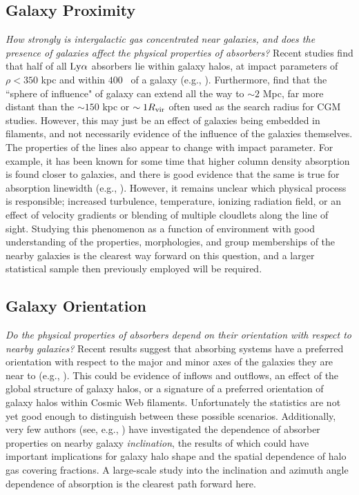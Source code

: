 \subsection{Galaxy Proximity}
\emph{How strongly is intergalactic gas concentrated near galaxies, and does the presence of galaxies affect the physical properties of absorbers?} Recent studies find that half of all $\rm Ly\alpha$ absorbers lie within galaxy halos, at impact parameters of $\rho <350$ kpc and within $400$ \kms~of a galaxy (e.g., \citealt{cote2005, prochaska2006, wakker2009}). Furthermore, \cite{sorini2018} find that the ``sphere of influence" of galaxy can extend all the way to $\sim 2$ Mpc, far more distant than the $\sim150$ kpc or $\sim 1 R_{\rm vir}$ often used as the search radius for CGM studies. However, this may just be an effect of galaxies being embedded in filaments, and not necessarily evidence of the influence of the galaxies themselves. The properties of the lines also appear to change with impact parameter. For example, it has been known for some time that higher column density absorption is found closer to galaxies, and there is good evidence that the same is true for absorption linewidth (e.g., \citealt{wakker2009, prochaska2011}). However, it remains unclear which physical process is responsible; increased turbulence, temperature, ionizing radiation field, or an effect of velocity gradients or blending of multiple cloudlets along the line of sight. Studying this phenomenon as a function of environment with good understanding of the properties, morphologies, and group memberships of the nearby galaxies is the clearest way forward on this question, and a larger statistical sample then previously employed will be required.


\subsection{Galaxy Orientation}
\emph{Do the physical properties of absorbers depend on their orientation with respect to nearby galaxies?} Recent results suggest that absorbing systems have a preferred orientation with respect to the major and minor axes of the galaxies they are near to (e.g., \citealt{kacprzak2011_inclination, kacprzak2012}). This could be evidence of inflows and outflows, an effect of the global structure of galaxy halos, or a signature of a preferred orientation of galaxy halos within Cosmic Web filaments. Unfortunately the statistics are not yet good enough to distinguish between these possible scenarios. Additionally, very few authors (see, e.g., \citealt{mathes2014, bordoloi2014}) have investigated the dependence of absorber properties on nearby galaxy \emph{inclination}, the results of which could have important implications for galaxy halo shape and the spatial dependence of halo gas covering fractions. A large-scale study into the inclination and azimuth angle dependence of absorption is the clearest path forward here.


